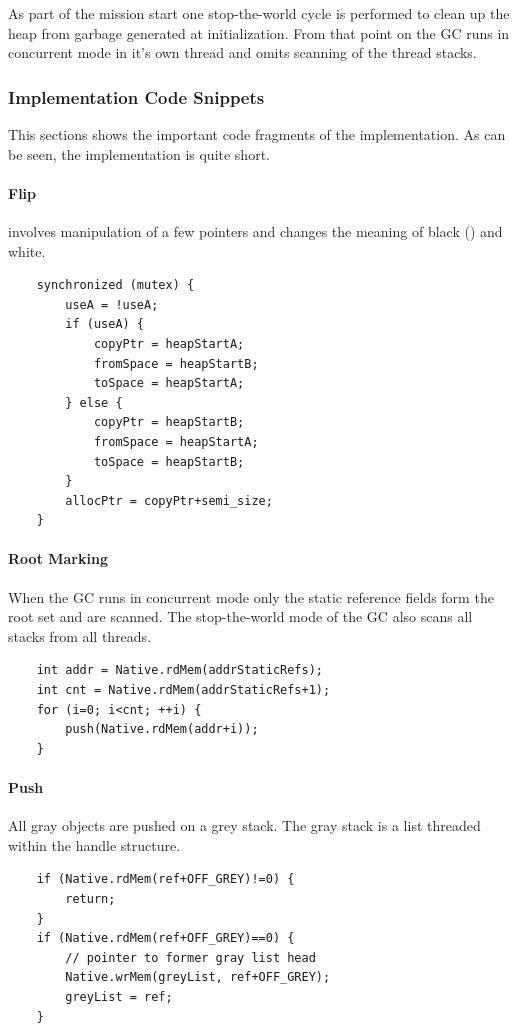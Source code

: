 As part of the mission start one stop-the-world cycle is performed
to clean up the heap from garbage generated at initialization. From
that point on the GC runs in concurrent mode in it's own thread and
omits scanning of the thread stacks.

\subsubsection{Implementation Code Snippets}

This sections shows the important code fragments of the
implementation. As can be seen, the implementation is quite short.

\paragraph{Flip} involves manipulation of a few pointers and changes
the meaning of black () and white.
%
\begin{lstlisting}
    synchronized (mutex) {
        useA = !useA;
        if (useA) {
            copyPtr = heapStartA;
            fromSpace = heapStartB;
            toSpace = heapStartA;
        } else {
            copyPtr = heapStartB;
            fromSpace = heapStartA;
            toSpace = heapStartB;
        }
        allocPtr = copyPtr+semi_size;
    }
\end{lstlisting}


\paragraph{Root Marking} When the GC runs in concurrent mode only
the static reference fields form the root set and are scanned. The
stop-the-world mode of the GC also scans all stacks from all
threads.
%
\begin{lstlisting}
    int addr = Native.rdMem(addrStaticRefs);
    int cnt = Native.rdMem(addrStaticRefs+1);
    for (i=0; i<cnt; ++i) {
        push(Native.rdMem(addr+i));
    }
\end{lstlisting}

\paragraph{Push} All gray objects are pushed on a grey stack. The
gray stack is a list threaded within the handle structure.
%
\begin{lstlisting}
    if (Native.rdMem(ref+OFF_GREY)!=0) {
        return;
    }
    if (Native.rdMem(ref+OFF_GREY)==0) {
        // pointer to former gray list head
        Native.wrMem(greyList, ref+OFF_GREY);
        greyList = ref;
    }
\end{lstlisting}

